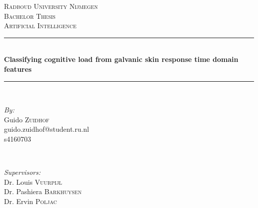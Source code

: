 \documentclass[11pt,leqno,a4paper]{report} %
\begin{document}
\begin{titlepage}

\newcommand{\HRule}{\rule{\linewidth}{0.5mm}} %

\center %
 

\textsc{\LARGE Radboud University Nijmegen}\\[1.5cm] %
\textsc{\Large Bachelor Thesis}\\[0.5cm] %
\textsc{\large Artificial Intelligence}\\[0.5cm] %


\HRule \\[0.4cm]
{ \huge \bfseries Classifying cognitive load from galvanic skin response time domain features}\\[0.4cm] %
\HRule \\[1.5cm]
 

\begin{minipage}{0.4\textwidth}
\begin{flushleft} \large
\emph{By:}\\
Guido \textsc{Zuidhof} %
\\\small{guido.zuidhof@student.ru.nl}
\\\small{s4160703}
\end{flushleft}
\end{minipage}
~
\begin{minipage}{0.4\textwidth}
\begin{flushright} \large
\emph{Supervisors:} \\
\small{Dr. }\large Louis \textsc{Vuurpijl}\\ 
\small{Dr. }\large Pashiera \textsc{Barkhuysen}\\
\small{Dr. }\large Ervin \textsc{Poljac}
\end{flushright}
\end{minipage}\\[4cm]


\end{titlepage}
\end{document}
